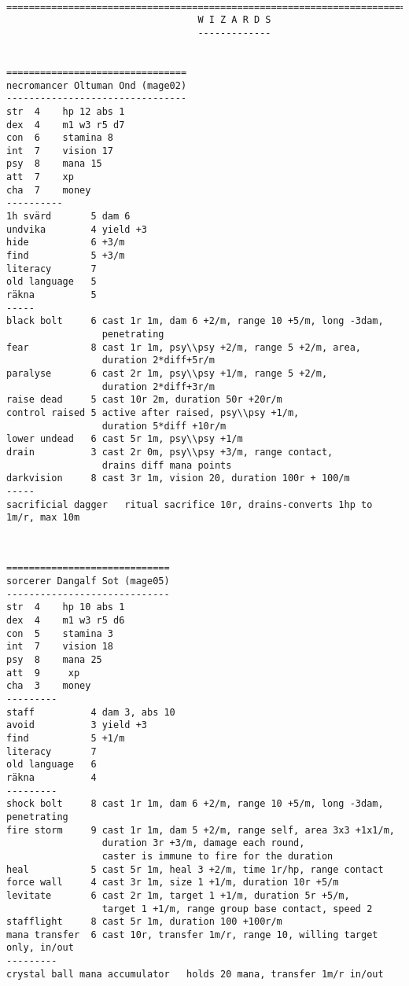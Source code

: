 \

\pagebreak[1]
\tiny \begin{samepage} \begin{verbatim}
================================================================================
                                  W I Z A R D S
                                  -------------


================================
necromancer Oltuman Ond (mage02)
--------------------------------
str  4    hp 12 abs 1
dex  4    m1 w3 r5 d7
con  6    stamina 8
int  7    vision 17
psy  8    mana 15
att  7    xp
cha  7    money
----------
1h svärd       5 dam 6
undvika        4 yield +3
hide           6 +3/m
find           5 +3/m
literacy       7
old language   5
räkna          5
-----
black bolt     6 cast 1r 1m, dam 6 +2/m, range 10 +5/m, long -3dam,
                 penetrating
fear           8 cast 1r 1m, psy\\psy +2/m, range 5 +2/m, area,
                 duration 2*diff+5r/m
paralyse       6 cast 2r 1m, psy\\psy +1/m, range 5 +2/m,
                 duration 2*diff+3r/m
raise dead     5 cast 10r 2m, duration 50r +20r/m
control raised 5 active after raised, psy\\psy +1/m,
                 duration 5*diff +10r/m
lower undead   6 cast 5r 1m, psy\\psy +1/m
drain          3 cast 2r 0m, psy\\psy +3/m, range contact,
                 drains diff mana points
darkvision     8 cast 3r 1m, vision 20, duration 100r + 100/m
-----
sacrificial dagger   ritual sacrifice 10r, drains-converts 1hp to 1m/r, max 10m
\end{verbatim} \end{samepage} \normalsize


\

\pagebreak[1]
\tiny \begin{samepage} \begin{verbatim}
=============================
sorcerer Dangalf Sot (mage05)
-----------------------------
str  4    hp 10 abs 1
dex  4    m1 w3 r5 d6
con  5    stamina 3
int  7    vision 18
psy  8    mana 25
att  9     xp
cha  3    money
---------
staff          4 dam 3, abs 10
avoid          3 yield +3
find           5 +1/m
literacy       7
old language   6
räkna          4
---------
shock bolt     8 cast 1r 1m, dam 6 +2/m, range 10 +5/m, long -3dam, penetrating
fire storm     9 cast 1r 1m, dam 5 +2/m, range self, area 3x3 +1x1/m,
                 duration 3r +3/m, damage each round,
                 caster is immune to fire for the duration
heal           5 cast 5r 1m, heal 3 +2/m, time 1r/hp, range contact
force wall     4 cast 3r 1m, size 1 +1/m, duration 10r +5/m
levitate       6 cast 2r 1m, target 1 +1/m, duration 5r +5/m,
                 target 1 +1/m, range group base contact, speed 2
stafflight     8 cast 5r 1m, duration 100 +100r/m
mana transfer  6 cast 10r, transfer 1m/r, range 10, willing target only, in/out
---------
crystal ball mana accumulator   holds 20 mana, transfer 1m/r in/out
\end{verbatim} \end{samepage} \normalsize


